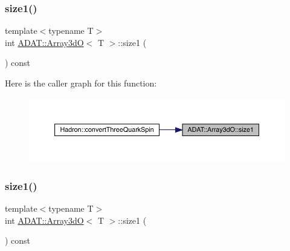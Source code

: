 \mbox{\label{classADAT_1_1Array3dO_a30149908b955c7eeebec86a24e6afffd}} 
\subsubsection{\texorpdfstring{size1()}{size1()}\hspace{0.1cm}{\footnotesize\ttfamily [1/2]}}
{\footnotesize\ttfamily template$<$typename T$>$ \\
int \mbox{\hyperlink{classADAT_1_1Array3dO}{A\+D\+A\+T\+::\+Array3dO}}$<$ T $>$\+::size1 (\begin{DoxyParamCaption}{ }\end{DoxyParamCaption}) const\hspace{0.3cm}{\ttfamily [inline]}}

Here is the caller graph for this function\+:\nopagebreak
\begin{figure}[H]
\begin{center}
\leavevmode
\includegraphics[width=350pt]{dd/da8/classADAT_1_1Array3dO_a30149908b955c7eeebec86a24e6afffd_icgraph}
\end{center}
\end{figure}
\mbox{\label{classADAT_1_1Array3dO_a30149908b955c7eeebec86a24e6afffd}} 
\subsubsection{\texorpdfstring{size1()}{size1()}\hspace{0.1cm}{\footnotesize\ttfamily [2/2]}}
{\footnotesize\ttfamily template$<$typename T$>$ \\
int \mbox{\hyperlink{classADAT_1_1Array3dO}{A\+D\+A\+T\+::\+Array3dO}}$<$ T $>$\+::size1 (\begin{DoxyParamCaption}{ }\end{DoxyParamCaption}) const\hspace{0.3cm}{\ttfamily [inline]}}

